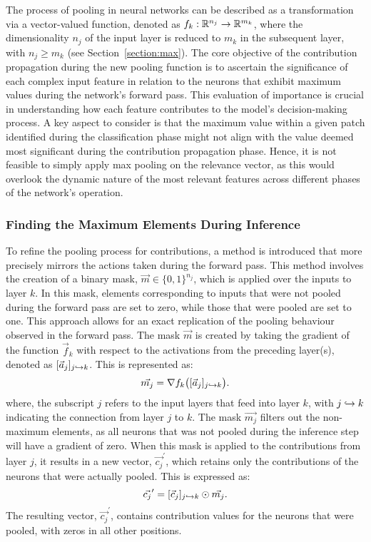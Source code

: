 The process of pooling in neural networks can be described as a transformation via a vector-valued function, denoted as $f_k:\mathbb{R}^{n_j}\to\mathbb{R}^{m_k}$, where the dimensionality $n_j$ of the input layer is reduced to $m_k$ in the subsequent layer, with $n_j \geq m_k$ (see Section~\ref{section:max}). The core objective of the contribution propagation during the new pooling function is to ascertain the significance of each complex input feature in relation to the neurons that exhibit maximum values during the network's forward pass. This evaluation of importance is crucial in understanding how each feature contributes to the model's decision-making process. A key aspect to consider is that the maximum value within a given patch identified during the classification phase might not align with the value deemed most significant during the contribution propagation phase. Hence, it is not feasible to simply apply max pooling on the relevance vector, as this would overlook the dynamic nature of the most relevant features across different phases of the network's operation.

\subsubsection{Finding the Maximum Elements During Inference}
To refine the pooling process for contributions, a method is introduced that more precisely mirrors the actions taken during the forward pass. This method involves the creation of a binary mask, $\vec{m} \in \{0,1\}^{n_j}$, which is applied over the inputs to layer \(k\). In this mask, elements corresponding to inputs that were not pooled during the forward pass are set to zero, while those that were pooled are set to one. This approach allows for an exact replication of the pooling behaviour observed in the forward pass. The mask \(\vec{m}\) is created by taking the gradient of the function \(\vec{f}_k\) with respect to the activations from the preceding layer(s), denoted as \([\vec{a}_j]_{j\hookrightarrow k}\). This is represented as:
\begin{equation}
    \vec{m_j} = \nabla f_k\big([\vec{a}_j]_{j\hookrightarrow k}\big).
\end{equation}
where, the subscript \(j\) refers to the input layers that feed into layer \(k\), with \(j \hookrightarrow k\) indicating the connection from layer \(j\) to \(k\). The mask \(\vec{m_j}\) filters out the non-maximum elements, as all neurons that was not pooled during the inference step will have a gradient of zero. When this mask is applied to the contributions from layer \(j\), it results in a new vector, \(\vec{c_j}^\prime\), which retains only the contributions of the neurons that were actually pooled. This is expressed as:
\begin{equation}
    \vec{c_j}^\prime = [\vec{c}_{j}]_{j\hookrightarrow k} \odot \vec{m_j}.
\end{equation}
The resulting vector, \(\vec{c_j}^\prime\), contains contribution values for the neurons that were pooled, with zeros in all other positions. 

